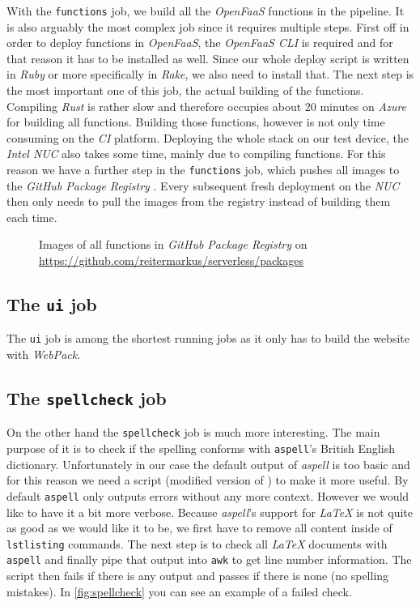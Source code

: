 With the \texttt{functions} job, we build all the \textit{OpenFaaS} functions in the pipeline. It is
also arguably the most complex job since it requires multiple steps. First off in order to deploy
functions in \textit{OpenFaaS}, the \textit{OpenFaaS CLI} \cite{faas-cli} is required and for that
reason it has to be installed as well. Since our whole deploy script is written in \textit{Ruby} or
more specifically in \textit{Rake}, we also need to install that. The next step is the most important
one of this job, the actual building of the functions. Compiling \textit{Rust} is rather slow and
therefore occupies about 20 minutes on \textit{Azure} for building all functions. Building those
functions, however is not only time consuming on the \textit{CI} platform. Deploying the whole stack
on our test device, the \textit{Intel NUC} also takes some time, mainly due to compiling functions.
For this reason we have a further step in the \texttt{functions} job, which pushes all images to the
\textit{GitHub Package Registry} \cite{github-registry}. Every subsequent fresh deployment on the
\textit{NUC} then only needs to pull the images from the registry instead of building them each time.

\begin{figure}[H]
  \centering
  \caption{Images of all functions in \textit{GitHub Package Registry} on \\
    \url{https://github.com/reitermarkus/serverless/packages}}
\end{figure}

\subsection{The \texttt{ui} job}

The \texttt{ui} job is among the shortest running jobs as it only has to build the website with
\textit{WebPack}.

\subsection{The \texttt{spellcheck} job}

On the other hand the \texttt{spellcheck} job is much more interesting. The main purpose of it is
to check if the spelling conforms with \texttt{aspell}'s British English dictionary. Unfortunately
in our case the default output of \textit{aspell} is too basic and for this reason we need a script
(modified version of \cite{aspell-awk}) to make it more useful. By default \texttt{aspell} only
outputs errors without any more context. However we would like to have it a bit more verbose.
Because \textit{aspell}'s support for \textit{LaTeX} is not quite as good as we would like it to be,
we first have to remove all content inside of \texttt{lstlisting} commands. The next step is to
check all \textit{LaTeX} documents with \texttt{aspell} and finally pipe that output into
\texttt{awk} to get line number information. The script then fails if there is any output
and passes if there is none (no spelling mistakes). In \autoref{fig:spellcheck} you can see an
example of a failed check.

